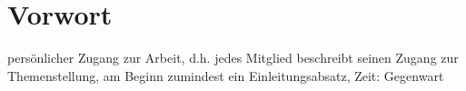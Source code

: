 \chapter*{Vorwort}

persönlicher Zugang zur Arbeit, d.h. jedes Mitglied beschreibt seinen Zugang zur Themenstellung, am Beginn zumindest ein Einleitungsabsatz, Zeit: Gegenwart


